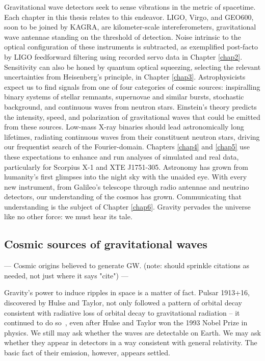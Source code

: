 Gravitational wave detectors seek to sense vibrations in the metric of spacetime.
Each chapter in this thesis relates to this endeavor.
LIGO, Virgo, and GEO600, soon to be joined by KAGRA, are kilometer-scale intereferometers, gravitational wave antennae standing on the threshold of detection.
Noise intrinsic to the optical configuration of these instruments is subtracted, as exemplified post-facto by LIGO feedforward filtering using recorded servo data in Chapter \ref{chap2}. 
Sensitivity can also be honed by quantum optical squeezing, selecting the relevant uncertainties from Heisenberg's principle, in Chapter \ref{chap3}.
Astrophysicists expect us to find signals from one of four categories of cosmic sources: inspiralling binary systems of stellar remnants, supernovae and similar bursts, stochastic background, and continuous waves from neutron stars.
Einstein's theory predicts the intensity, speed, and polarization of gravitational waves that could be emitted from these sources.
Low-mass X-ray binaries should lead astronomically long lifetimes, radiating continuous waves from their constituent neutron stars, driving our frequentist search of the Fourier-domain.
Chapters \ref{chap4} and \ref{chap5} use these expectations to enhance and run analyses of simulated and real data, particularly for Scorpius X-1 and XTE J1751-305.
Astronomy has grown from humanity's first glimpses into the night sky with the unaided eye. 
With every new instrument, from Galileo's telescope through radio antennae and neutrino detectors, our understanding of the cosmos has grown. 
Communicating that understanding is the subject of Chapter \ref{chap6}.
Gravity pervades the universe like no other force: we must hear its tale. 

        
        \subsection{Cosmic sources of gravitational waves}
        \label{cosmic_sources}
      
           --- Cosmic origins believed to generate GW. (note: should sprinkle citations as needed, not just where it says "cite") ---

		Gravity's power to induce ripples in space is a matter of fact. Pulsar 1913+16, discovered by Hulse and Taylor, not only followed a pattern of orbital decay consistent with radiative loss of orbital decay to gravitational radiation -- it continued to do so~\cite{WeisbergTaylor2004,Weisberg2010}, even after Hulse and Taylor won the 1993 Nobel Prize in physics. We still may ask whether the waves are detectable on Earth. We may ask whether they appear in detectors in a way consistent with general relativity. The basic fact of their emission, however, appears settled.

